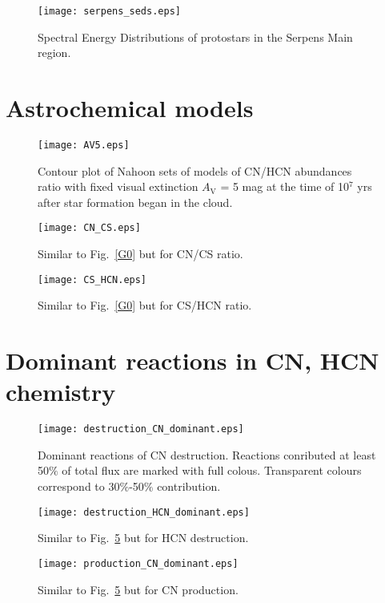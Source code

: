\documentclass{aa}
\begin{document}
\begin{appendix}
\begin{figure}
   \texttt{[image: serpens\_seds.eps]}
      \caption{Spectral Energy Distributions of protostars in the Serpens Main region.}
         \label{seds}
   \end{figure}


\section{Astrochemical models}

\begin{figure}
\centering
\texttt{[image: AV5.eps]}
\caption{Contour plot of Nahoon sets of models of CN/HCN abundances ratio with fixed visual extinction $A_\mathrm{V}$ = 5 mag at the time of 10$^{7}$ yrs after star formation began in the cloud.} 
\label{AV5}
\end{figure}

\begin{figure}
   \centering
   \texttt{[image: CN\_CS.eps]}
      \caption{Similar to Fig.~\ref{G0} but for CN/CS ratio.}
         \label{CN/CS}
   \end{figure}

\begin{figure}
   \centering
   \texttt{[image: CS\_HCN.eps]}
      \caption{Similar to Fig.~\ref{G0} but for CS/HCN ratio.}
         \label{CS/HCN}
   \end{figure}

\section{Dominant reactions in CN, HCN chemistry}

\begin{figure}
\texttt{[image: destruction\_CN\_dominant.eps]}
\caption{Dominant reactions of CN destruction. Reactions conributed at least 50$\%$ of total flux are marked with full colous. Transparent colours correspond to 30$\%$-50$\%$ contribution.}
\label{CN_dest}
\end{figure}

\begin{figure}
\texttt{[image: destruction\_HCN\_dominant.eps]}
\caption{Similar to Fig.~\ref{CN_dest} but for HCN destruction.}
\label{HCN_dest}
\end{figure}

\begin{figure}
\texttt{[image: production\_CN\_dominant.eps]}
\caption{Similar to Fig.~\ref{CN_dest} but for CN production.}
\label{CN_prod}
\end{figure}


\end{appendix}
\end{document}
